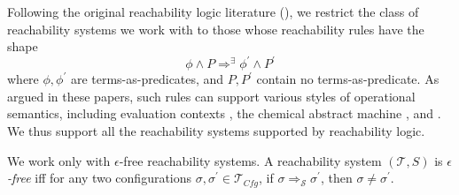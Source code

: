 \begin{remark}\label{rem:shapeOfReachabilityRules}
  Following the original reachability logic literature (\cite{RosuS12oopsla,StefanescuCMMSR19}),
  we restrict the class of reachability systems we work with to those whose reachability rules
have the shape
\begin{equation*}
    \phi \land P \Rightarrow^\exists \phi^\prime \land P^\prime
\end{equation*}
where $\phi,\phi^\prime$ are terms-as-predicates, and $P,P^\prime$ contain no terms-as-predicate.
  As argued in these papers, such rules can support various styles of operational semantics,
  including evaluation contexts \cite{PLTRedex}, the chemical abstract machine \cite{CHAM}, and \K{} \cite{KVision}.
  We thus support all the reachability systems supported by reachability logic.
\end{remark}

\begin{remark}\label{rem:noEmptySteps}
We work only with $\epsilon$-free reachability systems.
A reachability system $(\mathcal{T}, S)$ is \emph{$\epsilon$-free}
iff for any two configurations $\sigma, \sigma^\prime \in \mathcal{T}_{\mathit{Cfg}}$, if
$\sigma \Rightarrow_{\mathcal{S}} \sigma^\prime$, then $\sigma \not = \sigma^\prime$.
\end{remark}

